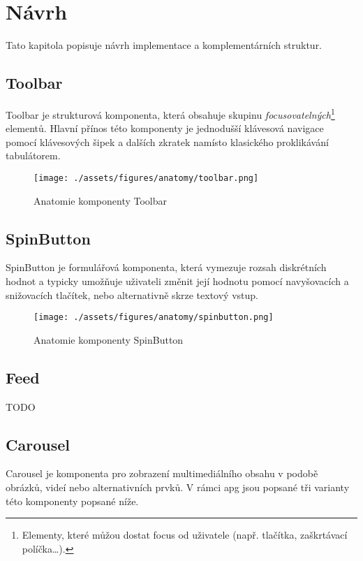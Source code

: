 \chapter{Návrh}

Tato kapitola popisuje návrh implementace a komplementárních struktur.

\section{Toolbar}

Toolbar je strukturová komponenta, která obsahuje skupinu \textit{focusovatelných}\footnote{Elementy, které můžou dostat focus od uživatele (např. tlačítka, zaškrtávací políčka\dots).} elementů.
Hlavní přínos této komponenty je jednodušší klávesová navigace pomocí klávesových šipek a dalších zkratek namísto klasického proklikávání tabulátorem.

\begin{figure}[htp]
    \centering
    \texttt{[image: ./assets/figures/anatomy/toolbar.png]}
    \captionsetup{justification=centering}
    \caption{Anatomie komponenty Toolbar}
\end{figure}

\section{SpinButton}

SpinButton je formulářová komponenta, která vymezuje rozsah diskrétních hodnot a typicky umožňuje uživateli změnit její hodnotu pomocí navyšovacích a snižovacích tlačítek, nebo alternativně skrze textový vstup.

\begin{figure}[htp]
    \centering
    \texttt{[image: ./assets/figures/anatomy/spinbutton.png]}
    \captionsetup{justification=centering}
    \caption{Anatomie komponenty SpinButton}
\end{figure}

\section{Feed}

TODO

\section{Carousel}

Carousel je komponenta pro zobrazení multimediálního obsahu v podobě obrázků, videí nebo alternativních prvků.
V rámci \gls{apg} jsou popsané tři varianty této komponenty popsané níže.

